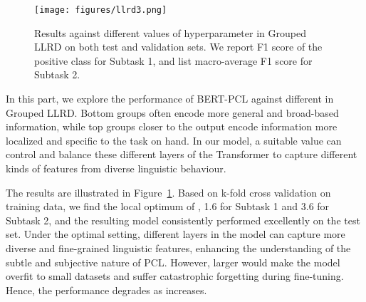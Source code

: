 \documentclass[11pt]{article}
\begin{document}
\begin{figure}[t]
    \centering
    \texttt{[image: figures/llrd3.png]}
    \caption{Results against different values of hyperparameter  in Grouped LLRD on both test and validation sets.
    We report F1 score of the positive class for Subtask 1, and list macro-average F1 score for Subtask 2.}
    \label{fig:llrd}
\end{figure}

In this part, we explore the performance of BERT-PCL against different  in Grouped LLRD.  
Bottom groups often encode more general and broad-based information, while top groups closer to the output encode information more localized and specific to the task on hand. In our model, a suitable value  can control and balance these different layers of the Transformer to capture different kinds of features from diverse linguistic behaviour. 

The results are illustrated in Figure~\ref{fig:llrd}.
Based on k-fold cross validation on training data, we find the local optimum of , 1.6 for Subtask 1 and 3.6 for Subtask 2, and the resulting model consistently performed excellently on the test set. Under the optimal setting, different layers in the model can capture more diverse and fine-grained linguistic features, enhancing the understanding of the subtle and subjective nature of PCL.
However, larger  would make the model overfit to small datasets and suffer catastrophic forgetting during fine-tuning. 
Hence, the performance degrades as  increases.


\begin{table*}[t]
  \centering
  \caption{
  Case studies in Subtask 1: Binary Classification. The table shows four examples of paragraphs, their gold labels and predictions by three methods (BERT-PCL, RoBERTa and ERNIE 2.0). 
  The pos. means the positive class of PCL, i.e. as instances containing PCL. 
  Likewise, the neg. means the negatives. }
\label{tab:case}
\end{table*}
\end{document}

